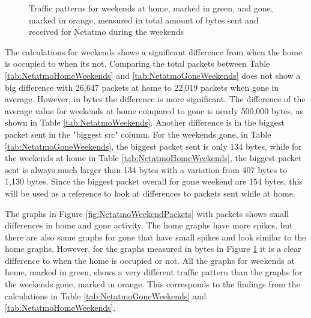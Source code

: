 \begin{figure}[H]
\begin{subfigure}[b]{0.47\textwidth}
    \end{subfigure}
    \begin{subfigure}[b]{0.47\textwidth}
    \end{subfigure}
    \begin{subfigure}[b]{0.47\textwidth}
    \end{subfigure}
   \begin{subfigure}[b]{0.47\textwidth}
    \end{subfigure}
    \hspace{0.6cm}
    \begin{subfigure}[b]{0.47\textwidth}
    \end{subfigure}
    \caption{Traffic patterns for weekends at home, marked in green, and gone, marked in orange, measured in total amount of bytes sent and received for Netatmo during the weekends}
    \label{fig:NetatmoWeekendBytes}
\end{figure}

The calculations for weekends shows a significant difference from when the home is occupied to when its not. Comparing the total packets between Table \ref{tab:NetatmoHomeWeekends} and \ref{tab:NetatmoGoneWeekends} does not show a big difference with 26,647 packets at home to 22,019 packets when gone in average. However, in bytes the difference is more significant. The difference of the average value for weekends at home compared to gone is nearly 500,000 bytes, as shown in Table \ref{tab:NetatmoWeekends}. Another difference is in the biggest packet sent in the "biggest src" column. For the weekends gone, in Table \ref{tab:NetatmoGoneWeekends}, the biggest packet sent is only 134 bytes, while for the weekends at home in Table \ref{tab:NetatmoHomeWeekends}, the biggest packet sent is always much larger than 134 bytes with a variation from 407 bytes to 1,130 bytes. Since the biggest packet overall for gone weekend are 154 bytes, this will be used as a reference to look at differences to packets sent while at home. 

The graphs in Figure \ref{fig:NetatmoWeekendPackets} with packets shows small differences in home and gone activity. The home graphs have more spikes, but there are also some graphs for gone that have small spikes and look similar to the home graphs. However, for the graphs measured in bytes in Figure \ref{fig:NetatmoWeekendBytes} it is a clear difference to when the home is occupied or not. All the graphs for weekends at home, marked in green, shows a very different traffic pattern than the graphs for the weekends gone, marked in orange. This corresponds to the findings from the calculations in Table \ref{tab:NetatmoGoneWeekends} and \ref{tab:NetatmoHomeWeekends}.

